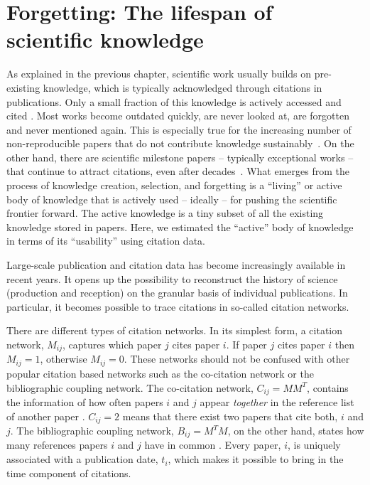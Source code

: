 \documentclass[draft,final]{vutinfth} %
\begin{document}
\chapter{Forgetting: The lifespan of scientific knowledge}
As explained in the previous chapter, scientific work usually builds on pre-existing knowledge, which is typically acknowledged through citations in publications. Only a small fraction of this knowledge is actively accessed and cited \cite{Meho_2007}. Most works become outdated quickly, are never looked at, are forgotten and  never mentioned again. This is especially true for the increasing number of non-reproducible papers that do not contribute knowledge sustainably~\cite{Loken2017, Ioannidis2005}. On the other hand, there are scientific milestone papers -- typically exceptional works -- that continue to attract citations, even after decades~\cite{Redner2005}. What emerges from the process of knowledge creation, selection, and forgetting is a ``living'' or active body of knowledge  that is actively used -- ideally -- for pushing the scientific frontier forward. The active knowledge is a tiny subset of all the existing knowledge stored in papers. Here, we estimated the  ``active'' body of knowledge in terms of its ``usability'' using citation data. 

Large-scale publication and citation data has become increasingly available in recent years. It opens up the possibility to reconstruct the history of science (production and reception) on the granular basis of individual publications. In particular, it becomes possible to trace citations in so-called citation networks.

There are different types of citation networks. In its simplest form, a citation network, $M_{ij}$, captures which paper $j$ cites paper $i$. If paper $j$ cites paper $i$ then $M_{ij} = 1$, otherwise $M_{ij} = 0$. These networks should not be confused with other popular citation based networks such as the co-citation network or the bibliographic coupling network. The co-citation network, $C_{ij} = MM^T$, contains the information of how often papers $i$ and $j$ appear {\em together} in the reference list of another paper \cite{Small1973}. $C_{ij}=2$ means that there exist two papers that cite both, $i$ and $j$. The bibliographic coupling network, $B_{ij} = M^TM$, on the other hand, states how many references papers $i$ and $j$ have in common \cite{MARTYN1964}. Every paper, $i$, is uniquely associated with a publication date, $t_i$, which makes it possible to bring in the time component of citations. 
\end{document}
